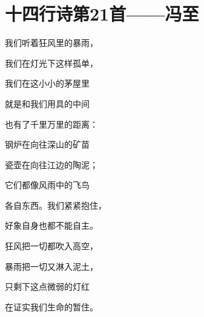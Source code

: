 \section{十四行诗第21首——冯至}


我们听着狂风里的暴雨，

我们在灯光下这样孤单，

我们在这小小的茅屋里

就是和我们用具的中间


也有了千里万里的距离：

钢炉在向往深山的矿苗

瓷壶在向往江边的陶泥；

它们都像风雨中的飞鸟


各自东西。我们紧紧抱住，

好象自身也都不能自主。

狂风把一切都吹入高空，


暴雨把一切又淋入泥土，

只剩下这点微弱的灯红

在证实我们生命的暂住。